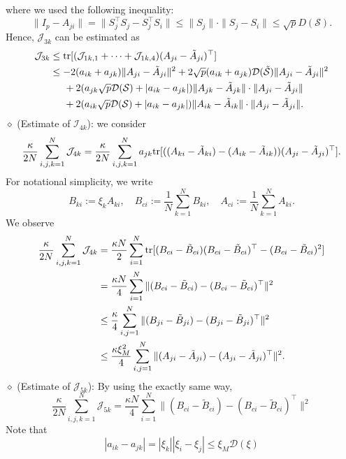 \documentclass[11pt,reqno]{amsart}
\numberwithin{figure}{section}
\newcommand{\kp}{\kappa}
\begin{document}
where we used the following  inequality:
\begin{equation*}
\|I_p - A_{ji} \| = \|S_j^\top S_j - S_j^\top  S_i\|\leq \|S_j \|\cdot \|S_j-S_i\|  \leq \sqrt p D(\mathcal S).
\end{equation*}
Hence, $\mathcal J_{3k}$ can be estimated as  
\begin{align*}
\mathcal J_{3k}&  \leq  \textup{tr}[ (\mathcal J_{1k,1}  +\cdots +  \mathcal J_{1k,4})(A_{ji} - \tilde A_{ji})^\top ]  \\
& \leq -2(a_{ik} + a_{jk}) \|A_{ji} - \tilde A_{ji}\|^2 + 2\sqrt{p}(a_{ik} + a_{jk})\mathcal D( \tilde{\mathcal S})\|A_{ji} - \tilde A_{ji}\|^2 \\
&\hspace{0.5cm} + 2 (a_{jk}\sqrt{p}\mathcal D(\mathcal S) + |a_{ik}-a_{jk}|)\|A_{jk} - \tilde A_{jk}\|\cdot \|A_{ji} - \tilde A_{ji}\| \\
&\hspace{0.5cm} + 2 (a_{ik}\sqrt{p}\mathcal D(\mathcal S) + |a_{ik}-a_{jk}|)\|A_{ik} - \tilde A_{ik}\|\cdot \|A_{ji} - \tilde A_{ji}\| .
\end{align*}
$\diamond$ (Estimate of $\mathcal I_{4k}$): we consider
\[
\frac{\kp}{2N}\sum_{i,j,k=1}^N \mathcal J_{4k} = \frac{\kp}{2N} \sum_{i,j,k=1}^N a_{jk} \textup{tr}[ ( ( A_{ki} - \tilde A_{ki}) - (A_{ik} - \tilde A_{ik})    )   (A_{ji} - \tilde A_{ji})^\top ].
\]
For notational simplicity, we write
 \[
B_{ki} := \xi_k A_{ki},\quad B_{ci} := \frac1N \sum_{k=1}^N B_{ki},\quad A_{ci} := \frac1N \sum_{k=1}^N A_{ki} .
\]
We observe
\begin{align*}
\frac{\kp}{2N}\sum_{i,j,k=1}^N \mathcal J_{4k} & = \frac{\kappa N}{2} \sum_{i=1}^N \textup{tr}[     (B_{ci} - \tilde B_{ci})(B_{ci} - \tilde B_{ci})^\top - (B_{ci} - \tilde B_{ci})^2 ] \\
& = \frac {\kappa N}4 \sum_{i=1}^N \| (B_{ci} - \tilde B_{ci})- (B_{ci} - \tilde B_{ci})^\top \|^2\\
&\leq \frac \kappa 4 \sum_{i,j=1}^N \| (B_{ji} - \tilde B_{ji} ) - (B_{ji} - \tilde B_{ji})^\top\|^2 \\
&\leq  \frac {\kappa \xi_M^2}{4} \sum_{i,j=1}^N \| (A_{ji} - \tilde A_{ji} ) - (A_{ji} - \tilde A_{ji})^\top\|^2.
\end{align*}
$\diamond$ (Estimate of $\mathcal J_{5k}$): By using the exactly same way, 
\[
\frac{\kp}{2N}\sum_{i,j,k=1}^N \mathcal J_{5k} =\frac {\kappa N}4 \sum_{i=1}^N \| (B_{ci} - \tilde B_{ci})- (B_{ci} - \tilde B_{ci})^\top \|^2
\]
Note that
\[
|a_{ik} - a_{jk}| = |\xi_k| |\xi_i - \xi_j| \leq \xi_M \mathcal D(\xi)
\]
\end{document}
